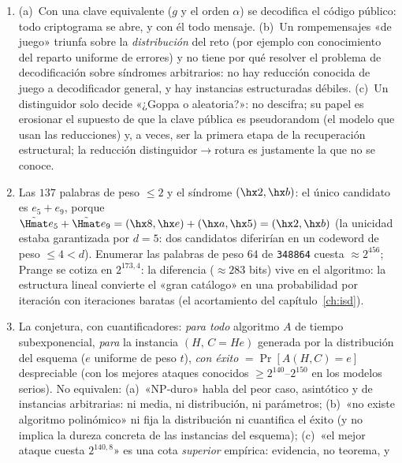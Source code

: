 \begin{enumerate}[leftmargin=1.9em,itemsep=4pt]
  \item (a)~Con una clave equivalente ($g$ y el orden $\alpha$) se
        decodifica el código público: todo criptograma se abre, y
        con él todo mensaje. (b)~Un rompemensajes «de juego» triunfa
        sobre la \emph{distribución} del reto (por ejemplo con
        conocimiento del reparto uniforme de errores) y no tiene por
        qué resolver el problema de decodificación sobre síndromes
        arbitrarios: no hay reducción conocida de juego a
        decodificador general, y hay instancias estructuradas
        débiles. (c)~Un distinguidor solo decide «¿Goppa o
        aleatoria?»: no descifra; su papel es erosionar el supuesto
        de que la clave pública es pseudorandom (el modelo que usan
        las reducciones) y, a veces, ser la primera etapa de la
        recuperación estructural; la reducción
        distinguidor$\to$rotura es justamente la que no se conoce.
  \item Las $137$ palabras de peso $\le2$ y el síndrome
        $(\hx2,\hx b)$: el único candidato es $e_5+e_9$, porque
        $\tilde{\Hmat}e_5+\tilde{\Hmat}e_9
        =(\hx8,\hx e)+(\hx a,\hx5)=(\hx2,\hx b)$ (la unicidad estaba
        garantizada por $d=5$: dos candidatos diferirían en un
        codeword de peso $\le4<d$). Enumerar las palabras de peso
        $64$ de \texttt{348864} cuesta $\approx2^{456}$; Prange se
        cotiza en $2^{173{,}4}$: la diferencia ($\approx283$ bits)
        vive en el algoritmo: la estructura lineal convierte el
        «gran catálogo» en una probabilidad por iteración con
        iteraciones baratas (el acortamiento del
        capítulo~\ref{ch:isd}).
  \item La conjetura, con cuantificadores: \emph{para todo}
        algoritmo $A$ de tiempo subexponencial, \emph{para} la
        instancia $(H,\,C=He)$ generada por la distribución del
        esquema ($e$ uniforme de peso $t$), \emph{con éxito}
        $=\Pr[A(H,C)=e]$ despreciable (con los mejores ataques
        conocidos $\ge2^{140}$--$2^{150}$ en los modelos serios).
        No equivalen: (a)~«NP-duro» habla del peor caso,
        asintótico y de instancias arbitrarias: ni media, ni
        distribución, ni parámetros; (b)~«no existe algoritmo
        polinómico» ni fija la distribución ni cuantifica el éxito
        (y no implica la dureza concreta de las instancias del
        esquema); (c)~«el mejor ataque cuesta $2^{140{,}8}$» es una
        cota \emph{superior} empírica: evidencia, no teorema, y

\end{enumerate}
